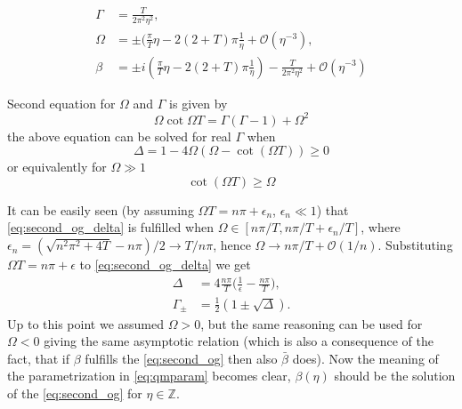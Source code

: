 \documentclass[
a4paper,%
10pt,%
titlepage,%
twoside%
]{article}
\begin{document}
\begin{align}\label{eq:qmparam}
  \Gamma&=\frac{T}{2\pi^2\eta^2},\\
  \Omega&=\pm(\frac{\pi}{T}\eta-2(2+T)\pi\frac{1}{\eta}+\mathcal{O}(\eta^{-3}),\\
  \beta&=\pm i(\frac{\pi}{T}\eta-2(2+T)\pi\frac{1}{\eta})-\frac{T}{2\pi^2\eta^2}+\mathcal{O}(\eta^{-3})
\end{align}

Second equation for $\Omega$ and $\Gamma$ is given by
\begin{equation}
  \label{eq:second_og}
  \Omega\cot{\Omega T}=\Gamma(\Gamma-1)+\Omega^2
\end{equation}
the above equation can be solved for real $\Gamma$ when
\begin{equation}
  \label{eq:second_og_delta}
  \Delta=1-4\Omega(\Omega-\cot(\Omega T))\ge 0
\end{equation}
or equivalently for $\Omega\gg 1$
\begin{equation}
  \cot(\Omega T)\ge\Omega
\end{equation}

It can be easily seen (by assuming $\Omega T=n\pi+\epsilon_n$,
$\epsilon_n\ll 1$) that \eqref{eq:second_og_delta} is fulfilled when
$\Omega\in[n\pi/T,n\pi/T+\epsilon_n/T]$, where
$\epsilon_n=(\sqrt{n^2\pi^2+4T}-n\pi)/2\rightarrow T/n\pi$, hence
$\Omega\rightarrow n\pi/T+\mathcal{O}(1/n)$. Substituting $\Omega
T=n\pi+\epsilon$ to \eqref{eq:second_og_delta} we get
\begin{align}
  \label{eq:second_og_delta_e}
  \Delta&=4\frac{n\pi}{T}\big(\frac{1}{\epsilon}-\frac{n\pi}{T}),\\
  \Gamma_\pm&=\frac{1}{2}(1\pm\sqrt{\Delta}).
\end{align}
Up to this point we assumed $\Omega>0$, but the same reasoning can be
used for $\Omega<0$ giving the same asymptotic relation (which is also
a consequence of the fact, that if $\beta$ fulfills the
\eqref{eq:second_og} then also $\bar\beta$ does). Now the meaning of
the parametrization in \eqref{eq:qmparam} becomes clear, $\beta(\eta)$
should be the solution of the \eqref{eq:second_og} for
$\eta\in\mathbb{Z}$.

\end{document}
